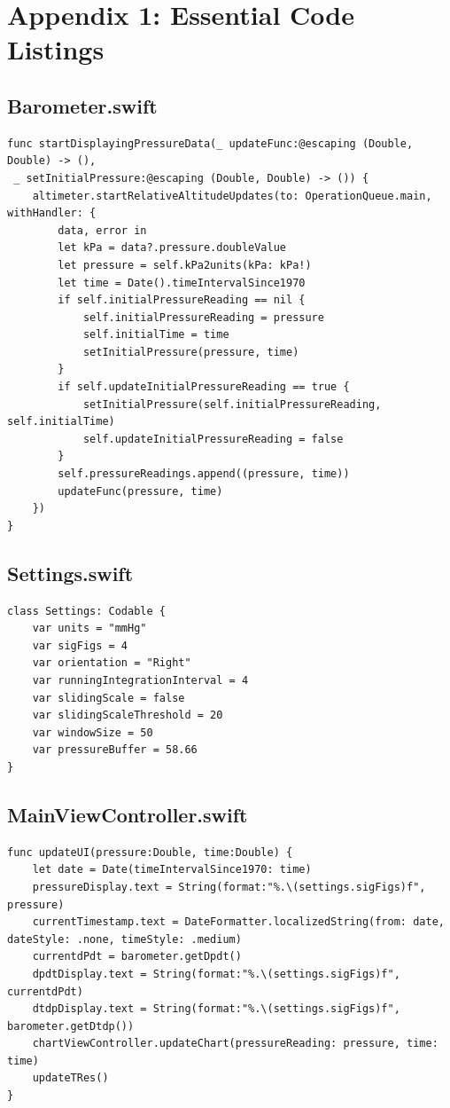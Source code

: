 \documentclass[onecolumn, draftclsnofoot,10pt, compsoc]{IEEEtran}
\begin{document}
\section{Appendix 1: Essential Code Listings}
\subsection{Barometer.swift}
    \begin{lstlisting}
func startDisplayingPressureData(_ updateFunc:@escaping (Double, Double) -> (),
 _ setInitialPressure:@escaping (Double, Double) -> ()) {
    altimeter.startRelativeAltitudeUpdates(to: OperationQueue.main, withHandler: {
        data, error in
        let kPa = data?.pressure.doubleValue
        let pressure = self.kPa2units(kPa: kPa!)
        let time = Date().timeIntervalSince1970
        if self.initialPressureReading == nil {
            self.initialPressureReading = pressure
            self.initialTime = time
            setInitialPressure(pressure, time)
        }
        if self.updateInitialPressureReading == true {
            setInitialPressure(self.initialPressureReading, self.initialTime)
            self.updateInitialPressureReading = false
        }
        self.pressureReadings.append((pressure, time))
        updateFunc(pressure, time)
    })
}
    \end{lstlisting}

\subsection{Settings.swift}
    \begin{lstlisting}
class Settings: Codable {
    var units = "mmHg"
    var sigFigs = 4
    var orientation = "Right"
    var runningIntegrationInterval = 4
    var slidingScale = false
    var slidingScaleThreshold = 20
    var windowSize = 50
    var pressureBuffer = 58.66
}
\end{lstlisting}

\subsection{MainViewController.swift}
    \begin{lstlisting}
func updateUI(pressure:Double, time:Double) {
    let date = Date(timeIntervalSince1970: time)
    pressureDisplay.text = String(format:"%.\(settings.sigFigs)f", pressure)
    currentTimestamp.text = DateFormatter.localizedString(from: date, dateStyle: .none, timeStyle: .medium)
    currentdPdt = barometer.getDpdt()
    dpdtDisplay.text = String(format:"%.\(settings.sigFigs)f", currentdPdt)
    dtdpDisplay.text = String(format:"%.\(settings.sigFigs)f", barometer.getDtdp())
    chartViewController.updateChart(pressureReading: pressure, time: time)
    updateTRes()
}
    \end{lstlisting}
\end{document}
